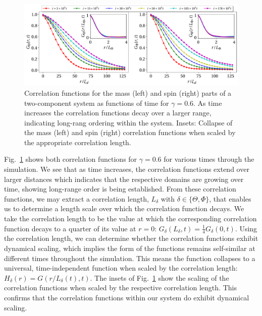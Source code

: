 \begin{figure}
    \centering
    \includegraphics[width=\textwidth]{
        gfx/ch-twoCompDynamics/correlation_functions.pdf}
    \caption[Mass and spin correlation functions associated with HQV relaxation
    dynamics]{\label{fig: correlation-functions}Correlation functions for the
    mass (left) and spin (right) parts of a two-component system as functions of
    time for \(\gamma=0.6\).
    As time increases the correlation functions decay over a larger range,
    indicating long-rang ordering within the system.
    Insets: Collapse of the mass (left) and spin (right) correlation functions
    when scaled by the appropriate correlation length.}
\end{figure}
Fig.~\ref{fig: correlation-functions} shows both correlation functions for
\(\gamma=0.6\) for various times through the simulation.
We see that as time increases, the correlation functions extend over larger
distances which indicates that the respective domains are growing over time,
showing long-range order is being established.
From these correlation functions, we may extract a correlation length,
\(L_\delta \) with \(\delta \in \{\Theta, \Phi \} \), that enables us to
determine a length scale over which the correlation function decays.
We take the correlation length to be the value at which the corresponding
correlation function decays to a quarter of its value at
\(r=0\): \(G_\delta(L_\delta, t) = \frac{1}{4}G_\delta(0, t)\).
Using the correlation length, we can determine whether the correlation functions
exhibit dynamical scaling, which implies the form of the functions remains
self-similar at different times throughout the simulation.
This means the function collapses to a universal, time-independent function
when scaled by the correlation length: \(H_\delta(r) = G(r/L_\delta(t), t)\).
The insets of Fig.~\ref{fig: correlation-functions} show the scaling of the
correlation functions when scaled by the respective correlation length.
This confirms that the correlation functions within our system do exhibit
dynamical scaling.

